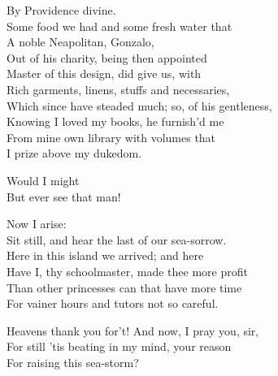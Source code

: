 	
\begin{verse_speech}[Prospero] 
By Providence divine.\\
Some food we had and some fresh water that\\
A noble Neapolitan, Gonzalo,\\
Out of his charity, being then appointed\\
Master of this design, did give us, with\\
Rich garments, linens, stuffs and necessaries,\\
Which since have steaded much; so, of his gentleness,\\
Knowing I loved my books, he furnish'd me\\
From mine own library with volumes that\\
I prize above my dukedom.
\end{verse_speech}

\begin{verse_speech}[Miranda] 
Would I might\\
But ever see that man!
\end{verse_speech}


\begin{verse_speech}[Prospero] 
Now I arise:\\
Sit still, and hear the last of our sea-sorrow.\\
Here in this island we arrived; and here\\
Have I, thy schoolmaster, made thee more profit\\
Than other princesses can that have more time\\
For vainer hours and tutors not so careful.
\end{verse_speech}

\begin{verse_speech}[Miranda] 
Heavens thank you for't! And now, I pray you, sir,\\
For still 'tis beating in my mind, your reason\\
For raising this sea-storm?
\end{verse_speech}

